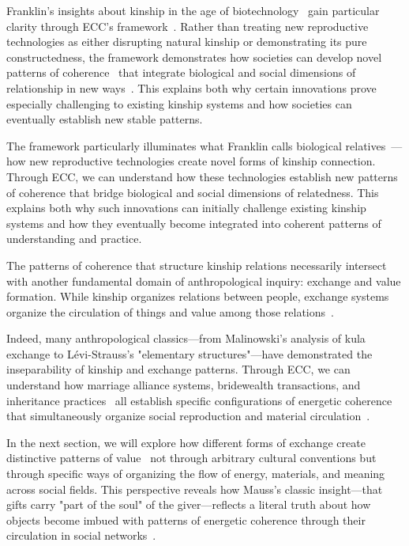 Franklin's insights about kinship in the age of biotechnology~ gain particular clarity through ECC's framework~\cite{franklin2013biological}. Rather than treating new reproductive technologies as either disrupting natural kinship or demonstrating its pure constructedness, the framework demonstrates how societies can develop novel patterns of coherence~ that integrate biological and social dimensions of relationship in new ways~\cite{latour2005reassembling}. This explains both why certain innovations prove especially challenging to existing kinship systems and how societies can eventually establish new stable patterns.

The framework particularly illuminates what Franklin calls biological relatives~\cite{franklin2013biological}—how new reproductive technologies create novel forms of kinship connection. Through ECC, we can understand how these technologies establish new patterns of coherence that bridge biological and social dimensions of relatedness. This explains both why such innovations can initially challenge existing kinship systems and how they eventually become integrated into coherent patterns of understanding and practice.

The patterns of coherence that structure kinship relations necessarily intersect with another fundamental domain of anthropological inquiry: exchange and value formation. While kinship organizes relations between people, exchange systems organize the circulation of things and value among those relations~\cite{mauss1925gift,gregory1982gifts}.

Indeed, many anthropological classics—from Malinowski's analysis of kula exchange to Lévi-Strauss's "elementary structures"—have demonstrated the inseparability of kinship and exchange patterns. Through ECC, we can understand how marriage alliance systems, bridewealth transactions, and inheritance practices~ all establish specific configurations of energetic coherence that simultaneously organize social reproduction and material circulation~\cite{strathern1992after,gregory1982gifts}.

In the next section, we will explore how different forms of exchange create distinctive patterns of value~ not through arbitrary cultural conventions but through specific ways of organizing the flow of energy, materials, and meaning across social fields. This perspective reveals how Mauss's classic insight—that gifts carry "part of the soul" of the giver—reflects a literal truth about how objects become imbued with patterns of energetic coherence through their circulation in social networks~\cite{mauss1925gift,miller2005materiality}.
